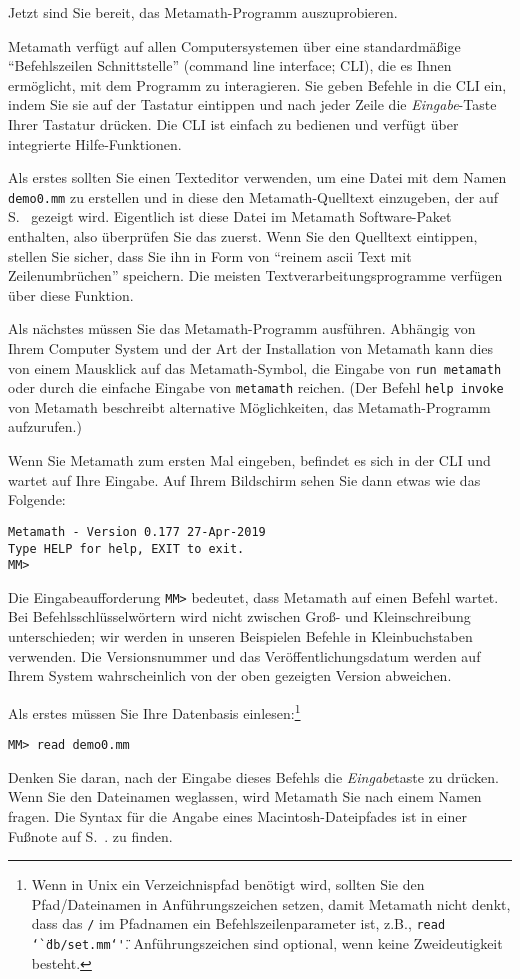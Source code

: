 Jetzt sind Sie bereit, das Metamath-Programm auszuprobieren.

Metamath verfügt auf allen Computersystemen über eine standardmäßige "`Befehlszeilen Schnittstelle"' (command line interface; CLI), die es Ihnen ermöglicht, mit dem Programm zu interagieren.
Sie geben Befehle in die CLI ein, indem Sie sie auf der Tastatur eintippen und nach jeder Zeile die {\em Eingabe}-Taste Ihrer Tastatur drücken.
Die CLI ist einfach zu bedienen und verfügt über integrierte Hilfe-Funktionen.

Als erstes sollten Sie einen Texteditor verwenden, um eine Datei mit dem Namen \texttt{demo0.mm} zu erstellen und in diese den Metamath-Quelltext einzugeben, der auf S.~\pageref{demo0} gezeigt wird.  Eigentlich ist diese Datei im Metamath Software-Paket enthalten, also überprüfen Sie das zuerst.  Wenn Sie den Quelltext eintippen, stellen Sie sicher, dass Sie ihn in Form von "`reinem {\sc ascii} Text mit Zeilenumbrüchen"' speichern.  Die meisten Textverarbeitungsprogramme verfügen über diese Funktion.

Als nächstes müssen Sie das Metamath-Programm ausführen.  Abhängig von Ihrem Computer
System und der Art der Installation von Metamath kann dies von einem Mausklick auf das Metamath-Symbol, die Eingabe von \texttt{run metamath} oder durch die einfache Eingabe von \texttt{metamath} reichen.  (Der Befehl {\tt help invoke} von Metamath beschreibt
alternative Möglichkeiten, das Metamath-Programm aufzurufen.)

Wenn Sie Metamath zum ersten Mal eingeben, befindet es sich in der CLI und wartet auf Ihre Eingabe. Auf Ihrem Bildschirm sehen Sie dann etwas wie das Folgende:
\begin{verbatim}
Metamath - Version 0.177 27-Apr-2019
Type HELP for help, EXIT to exit.
MM>
\end{verbatim}
Die Eingabeaufforderung \texttt{MM>} bedeutet, dass Metamath auf einen Befehl wartet.
Bei Befehlsschlüsselwörtern wird nicht zwischen Groß- und Kleinschreibung unterschieden; wir werden in unseren Beispielen Befehle in Kleinbuchstaben verwenden.
Die Versionsnummer und das Veröffentlichungsdatum werden auf Ihrem System wahrscheinlich von der oben gezeigten Version abweichen.

Als erstes müssen Sie Ihre Datenbasis einlesen:\footnote{Wenn in Unix ein Verzeichnispfad benötigt wird, sollten Sie den Pfad/Dateinamen in Anführungszeichen setzen, damit Metamath nicht denkt, dass das \texttt{/} im Pfadnamen ein Befehlszeilenparameter ist, z.B., \texttt{read \char`\"`db/set.mm\char`\"'}.  Anführungszeichen sind optional, wenn keine Zweideutigkeit besteht.}
\begin{verbatim}
MM> read demo0.mm
\end{verbatim}
Denken Sie daran, nach der Eingabe dieses Befehls die {\em Eingabe}taste zu drücken.  Wenn Sie den Dateinamen weglassen, wird Metamath Sie nach einem Namen fragen.   Die Syntax für die Angabe eines Macintosh-Dateipfades ist in einer Fußnote auf
S.~\pageref{includef}. zu finden.

